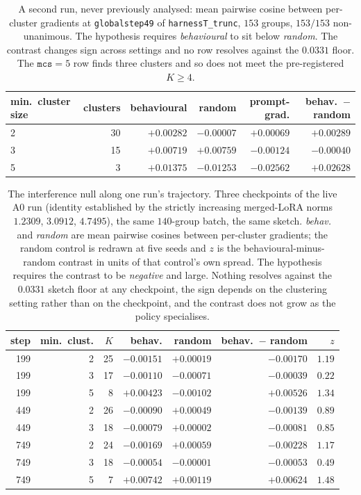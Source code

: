 \begin{table}[t]
\centering\small
\caption{A second run, never previously analysed: mean pairwise cosine between per-cluster
gradients at \texttt{globalstep49} of \texttt{harnessT\_trunc}, $153$ groups, $153/153$
non-unanimous. The hypothesis requires \emph{behavioural} to sit below \emph{random}. The
contrast changes sign across settings and no row resolves against the $0.0331$ floor. The
$\texttt{mcs}=5$ row finds three clusters and so does not meet the pre-registered $K\ge4$.}
\label{tab:gate0late49}
\begin{tabular}{lrrrrr}
\toprule
min.\ cluster size & clusters & behavioural & random & prompt-grad. & behav.\ $-$ random \\
\midrule
2 & 30 & $+0.00282$ & $-0.00007$ & $+0.00069$ & $+0.00289$ \\
3 & 15 & $+0.00719$ & $+0.00759$ & $-0.00124$ & $-0.00040$ \\
5 & \phantom{0}3 & $+0.01375$ & $-0.01253$ & $-0.02562$ & $+0.02628$ \\
\bottomrule
\end{tabular}
\end{table}

\begin{table}[t]
\centering\small
\caption{The interference null along one run's trajectory. Three checkpoints of the live A0 run
(identity established by the strictly increasing merged-LoRA norms $1.2309$, $3.0912$,
$4.7495$), the same $140$-group batch, the same sketch. \emph{behav.} and \emph{random} are mean
pairwise cosines between per-cluster gradients; the random control is redrawn at five seeds and
$z$ is the behavioural-minus-random contrast in units of that control's own spread. The
hypothesis requires the contrast to be \emph{negative} and large. Nothing resolves against the
$0.0331$ sketch floor at any checkpoint, the sign depends on the clustering setting rather than
on the checkpoint, and the contrast does not grow as the policy specialises.}
\label{tab:gate0traj}
\begin{tabular}{rrrrrrr}
\toprule
step & min.\ clust. & $K$ & behav. & random & behav.\ $-$ random & $z$ \\
\midrule
199 & 2 & 25 & $-0.00151$ & $+0.00019$ & $-0.00170$ & $1.19$ \\
199 & 3 & 17 & $-0.00110$ & $-0.00071$ & $-0.00039$ & $0.22$ \\
199 & 5 & \phantom{0}8 & $+0.00423$ & $-0.00102$ & $+0.00526$ & $1.34$ \\
449 & 2 & 26 & $-0.00090$ & $+0.00049$ & $-0.00139$ & $0.89$ \\
449 & 3 & 18 & $-0.00079$ & $+0.00002$ & $-0.00081$ & $0.85$ \\
749 & 2 & 24 & $-0.00169$ & $+0.00059$ & $-0.00228$ & $1.17$ \\
749 & 3 & 18 & $-0.00054$ & $-0.00001$ & $-0.00053$ & $0.49$ \\
749 & 5 & \phantom{0}7 & $+0.00742$ & $+0.00119$ & $+0.00624$ & $1.48$ \\
\bottomrule
\end{tabular}
\end{table}

